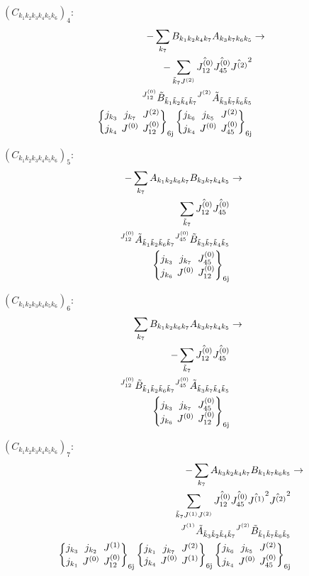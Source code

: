 \documentclass[11pt]{article}
\newcommand{\sixj}[6]{\begingroup\setlength{\arraycolsep}{0.2em}\begin{Bmatrix} #1 & #2 & #3 \\ #4 & #5 & #6 \end{Bmatrix}_{\text{6j}}\endgroup}
\begin{document}
$\left({C}_{{k}_{1}{k}_{2}{k}_{3}{k}_{4}{k}_{5}{k}_{6}}\right)_{4}$:
\begin{align}
-\sum_{{k}_{7}}{B}_{{k}_{1}{k}_{2}{k}_{4}{k}_{7}}{A}_{{k}_{3}{k}_{7}{k}_{6}{k}_{5}}&\rightarrow \notag \\-\sum_{\tilde{k}_{7}J^{(2)}}\hat{J^{(0)}_{12}}\hat{J^{(0)}_{45}}\hat{J^{(2)}}^{2}& \notag \\{}^{J^{(0)}_{12}}\tilde{B}_{\tilde{k}_{1}\tilde{k}_{2}\tilde{k}_{4}\tilde{k}_{7}}{}^{J^{(2)}}\tilde{A}_{\tilde{k}_{3}\tilde{k}_{7}\tilde{k}_{6}\tilde{k}_{5}}& \notag \\\sixj{j_{{k}_{3}}}{j_{{k}_{7}}}{J^{(2)}}{j_{{k}_{4}}}{J^{(0)}}{J^{(0)}_{12}}\sixj{j_{{k}_{6}}}{j_{{k}_{5}}}{J^{(2)}}{j_{{k}_{4}}}{J^{(0)}}{J^{(0)}_{45}}
\end{align}

$\left({C}_{{k}_{1}{k}_{2}{k}_{3}{k}_{4}{k}_{5}{k}_{6}}\right)_{5}$:
\begin{align}
-\sum_{{k}_{7}}{A}_{{k}_{1}{k}_{2}{k}_{6}{k}_{7}}{B}_{{k}_{3}{k}_{7}{k}_{4}{k}_{5}}&\rightarrow \notag \\\sum_{\tilde{k}_{7}}\hat{J^{(0)}_{12}}\hat{J^{(0)}_{45}}& \notag \\{}^{J^{(0)}_{12}}\tilde{A}_{\tilde{k}_{1}\tilde{k}_{2}\tilde{k}_{6}\tilde{k}_{7}}{}^{J^{(0)}_{45}}\tilde{B}_{\tilde{k}_{3}\tilde{k}_{7}\tilde{k}_{4}\tilde{k}_{5}}& \notag \\\sixj{j_{{k}_{3}}}{j_{{k}_{7}}}{J^{(0)}_{45}}{j_{{k}_{6}}}{J^{(0)}}{J^{(0)}_{12}}
\end{align}

$\left({C}_{{k}_{1}{k}_{2}{k}_{3}{k}_{4}{k}_{5}{k}_{6}}\right)_{6}$:
\begin{align}
\sum_{{k}_{7}}{B}_{{k}_{1}{k}_{2}{k}_{6}{k}_{7}}{A}_{{k}_{3}{k}_{7}{k}_{4}{k}_{5}}&\rightarrow \notag \\-\sum_{\tilde{k}_{7}}\hat{J^{(0)}_{12}}\hat{J^{(0)}_{45}}& \notag \\{}^{J^{(0)}_{12}}\tilde{B}_{\tilde{k}_{1}\tilde{k}_{2}\tilde{k}_{6}\tilde{k}_{7}}{}^{J^{(0)}_{45}}\tilde{A}_{\tilde{k}_{3}\tilde{k}_{7}\tilde{k}_{4}\tilde{k}_{5}}& \notag \\\sixj{j_{{k}_{3}}}{j_{{k}_{7}}}{J^{(0)}_{45}}{j_{{k}_{6}}}{J^{(0)}}{J^{(0)}_{12}}
\end{align}

$\left({C}_{{k}_{1}{k}_{2}{k}_{3}{k}_{4}{k}_{5}{k}_{6}}\right)_{7}$:
\begin{align}
-\sum_{{k}_{7}}{A}_{{k}_{3}{k}_{2}{k}_{4}{k}_{7}}{B}_{{k}_{1}{k}_{7}{k}_{6}{k}_{5}}&\rightarrow \notag \\\sum_{\tilde{k}_{7}J^{(1)}J^{(2)}}\hat{J^{(0)}_{12}}\hat{J^{(0)}_{45}}\hat{J^{(1)}}^{2}\hat{J^{(2)}}^{2}& \notag \\{}^{J^{(1)}}\tilde{A}_{\tilde{k}_{3}\tilde{k}_{2}\tilde{k}_{4}\tilde{k}_{7}}{}^{J^{(2)}}\tilde{B}_{\tilde{k}_{1}\tilde{k}_{7}\tilde{k}_{6}\tilde{k}_{5}}& \notag \\\sixj{j_{{k}_{3}}}{j_{{k}_{2}}}{J^{(1)}}{j_{{k}_{1}}}{J^{(0)}}{J^{(0)}_{12}}\sixj{j_{{k}_{1}}}{j_{{k}_{7}}}{J^{(2)}}{j_{{k}_{4}}}{J^{(0)}}{J^{(1)}}\sixj{j_{{k}_{6}}}{j_{{k}_{5}}}{J^{(2)}}{j_{{k}_{4}}}{J^{(0)}}{J^{(0)}_{45}}
\end{align}
\end{document}
